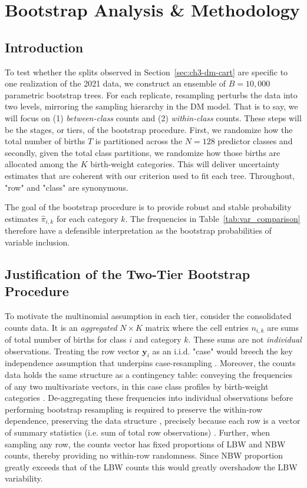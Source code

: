 \newpage 

\section{Bootstrap Analysis \& Methodology}
\label{sec:ch3:boot}

\subsection{Introduction}
\label{sec:ch3-boot-intro}
To test whether the splits observed in Section~\ref{sec:ch3-dm-cart} are specific to one realization of the 2021 data, we construct an ensemble of \(B =10,000\) parametric bootstrap trees. For each replicate, resampling perturbs the data into two levels, mirroring the sampling hierarchy in the DM model. That is to say, we will focus on (1) \emph{between-class} counts and (2) \emph{within-class} counts. These steps will be the stages, or tiers, of the bootstrap procedure. First, we randomize how the total number of births \(T\) is partitioned across the \(N=128\) predictor classes and secondly, given the total class partitions, we randomize how those births are allocated among the \(K\) birth-weight categories. This will deliver uncertainty estimates that are coherent with our criterion used to fit each tree. Throughout, "row" and "class" are synonymous. 

The goal of the bootstrap procedure is to provide robust and stable probability estimates \(\hat{\pi}_{i,k}\) for each category \(k\). The frequencies in Table~\ref{tab:var_comparison} therefore have a defensible interpretation as the bootstrap probabilities of variable inclusion.

\subsection{Justification of the Two-Tier Bootstrap Procedure}
\label{sec:ch3-justifiaction}
To motivate the multinomial assumption in each tier, consider the consolidated counts data. It is an \emph{aggregated} \(N \times K\) matrix where the cell entries \(n_{i,k}\) are sums of total number of births for class \(i\) and category \(k\). These sums are not \emph{individual} observations. Treating the row vector \(\mathbf{y}_i\) as an i.i.d. "case" would breech the key independence assumption that underpins case-resampling \parencite[slide 47]{case_resampling} \parencite{math10244671}. Moreover, the counts data holds the same structure as a contingency table: conveying the frequencies of any two multivariate vectors, in this case class profiles by birth-weight categories \parencite{wiki:contingency}. De-aggregating these frequencies into individual observations before performing bootstrap resampling is required to preserve the within-row dependence, preserving the data structure \parencite{stackexchangeBootstrapResampling}, precisely because each row is a vector of summary statistics (i.e. sum of total row observations) \parencite{wiki:summary_statistic}. Further, when sampling any row, the counts vector has fixed proportions of LBW and NBW counts, thereby providing no within-row randomness. Since NBW proportion greatly exceeds that of the LBW counts this would greatly overshadow the LBW variability.

